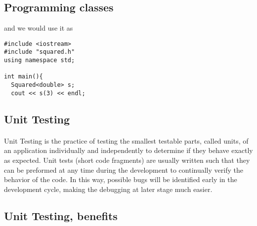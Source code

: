 \documentclass[%
oneside,                 %
final,                   %
10pt]{article}
\begin{document}
\subsection*{Programming classes}

and we would use it as

\begin{verbatim}
#include <iostream>
#include "squared.h"
using namespace std;

int main(){
  Squared<double> s;
  cout << s(3) << endl;

\end{verbatim}


\subsection*{Unit Testing}

\paragraph{}
Unit Testing is the practice of testing the smallest testable parts,
called units, of an application individually and independently to
determine if they behave exactly as expected. Unit tests (short code
fragments) are usually written such that they can be preformed at any
time during the development to continually verify the behavior of the
code. In this way, possible bugs will be identified early in the
development cycle, making the debugging at later stage much
easier.


\subsection*{Unit Testing, benefits}

\end{document}

